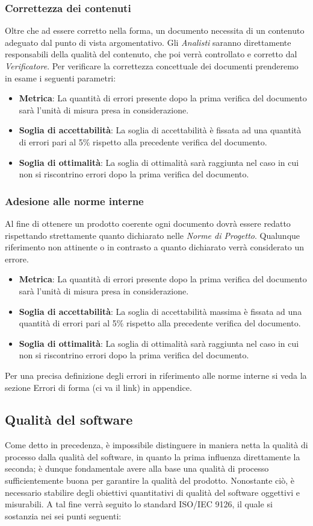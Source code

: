 \subsubsection{Correttezza dei contenuti}
Oltre che ad essere corretto nella forma, un documento necessita di un contenuto adeguato dal punto di vista argomentativo. Gli \emph{Analisti} saranno direttamente responsabili della qualità del contenuto, che poi verrà controllato e corretto dal \emph{Verificatore}.
Per verificare la correttezza concettuale dei documenti prenderemo in esame i seguenti parametri:
\begin{itemize}
	\item \textbf{Metrica}: La quantità di errori presente dopo la prima verifica del documento sarà l'unità di misura presa in considerazione.
	\item \textbf{Soglia di accettabilità}: La soglia di accettabilità è fissata ad una quantità di errori pari al 5\% rispetto alla precedente verifica del documento.
	\item \textbf{Soglia di ottimalità}: La soglia di ottimalità sarà raggiunta nel caso in cui non si riscontrino errori dopo la prima verifica del documento.
\end{itemize}
\subsubsection{Adesione alle norme interne}
Al fine di ottenere un prodotto coerente ogni documento dovrà essere redatto rispettando strettamente quanto dichiarato nelle \emph{Norme di Progetto}.
Qualunque riferimento non attinente o in contrasto a quanto dichiarato verrà considerato un errore.
\begin{itemize}
	\item \textbf{Metrica}: La quantità di errori presente dopo la prima verifica del documento sarà l'unità di misura presa in considerazione. 
	\item \textbf{Soglia di accettabilità}: La soglia di accettabilità massima è fissata ad una quantità di errori pari al 5\% rispetto alla precedente verifica del documento.
	\item \textbf{Soglia di ottimalità}: La soglia di ottimalità sarà raggiunta nel caso in cui non si riscontrino errori dopo la prima verifica del documento.
\end{itemize}
Per una precisa definizione degli errori in riferimento alle norme interne si veda la sezione Errori di forma (ci va il link) in appendice.
\subsection{Qualità del software}
Come detto in precedenza, è impossibile distinguere in maniera netta la qualità di processo dalla qualità del software, in quanto la prima influenza direttamente la seconda; è dunque fondamentale avere alla base una qualità di processo sufficientemente buona per garantire la qualità del prodotto. Nonostante ciò, è necessario stabilire degli obiettivi quantitativi di qualità del software oggettivi e misurabili. A tal fine verrà seguito lo standard ISO/IEC 9126, il quale si sostanzia nei sei punti seguenti:

